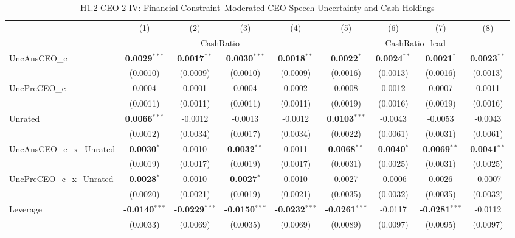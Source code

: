 \begin{landscape}
\begin{table}[H]
\setlength{\tabcolsep}{3pt}
\renewcommand{\arraystretch}{0.85}
\centering
\caption{H1.2 CEO 2-IV: Financial Constraint--Moderated CEO Speech Uncertainty and Cash Holdings}
\label{tab:h1_2_ceo2}
\scriptsize
\begin{tabular}{lcccccccc}
\toprule
 & (1) & (2) & (3) & (4) & (5) & (6) & (7) & (8) \\
 & \multicolumn{4}{c}{CashRatio} & \multicolumn{4}{c}{CashRatio\_lead} \\
\cmidrule(lr){2-5} \cmidrule(lr){6-9}
\midrule
UncAnsCEO\_c & \textbf{0.0029}$^{***}$ & \textbf{0.0017}$^{**}$ & \textbf{0.0030}$^{***}$ & \textbf{0.0018}$^{**}$ & \textbf{0.0022}$^{*}$ & \textbf{0.0024}$^{**}$ & \textbf{0.0021}$^{*}$ & \textbf{0.0023}$^{**}$ \\
 & (0.0010) & (0.0009) & (0.0010) & (0.0009) & (0.0016) & (0.0013) & (0.0016) & (0.0013) \\
UncPreCEO\_c & 0.0004 & 0.0001 & 0.0004 & 0.0002 & 0.0008 & 0.0012 & 0.0007 & 0.0011 \\
 & (0.0011) & (0.0011) & (0.0011) & (0.0011) & (0.0019) & (0.0016) & (0.0019) & (0.0016) \\
Unrated & \textbf{0.0066}$^{***}$ & -0.0012 & -0.0013 & -0.0012 & \textbf{0.0103}$^{***}$ & -0.0043 & -0.0053 & -0.0043 \\
 & (0.0012) & (0.0034) & (0.0017) & (0.0034) & (0.0022) & (0.0061) & (0.0031) & (0.0061) \\
UncAnsCEO\_c\_x\_Unrated & \textbf{0.0030}$^{*}$ & 0.0010 & \textbf{0.0032}$^{**}$ & 0.0011 & \textbf{0.0068}$^{**}$ & \textbf{0.0040}$^{*}$ & \textbf{0.0069}$^{**}$ & \textbf{0.0041}$^{**}$ \\
 & (0.0019) & (0.0017) & (0.0019) & (0.0017) & (0.0031) & (0.0025) & (0.0031) & (0.0025) \\
UncPreCEO\_c\_x\_Unrated & \textbf{0.0028}$^{*}$ & 0.0010 & \textbf{0.0027}$^{*}$ & 0.0010 & 0.0027 & -0.0006 & 0.0026 & -0.0007 \\
 & (0.0020) & (0.0021) & (0.0019) & (0.0021) & (0.0035) & (0.0032) & (0.0035) & (0.0032) \\
\midrule
Leverage & \textbf{-0.0140}$^{***}$ & \textbf{-0.0229}$^{***}$ & \textbf{-0.0150}$^{***}$ & \textbf{-0.0232}$^{***}$ & \textbf{-0.0261}$^{***}$ & -0.0117 & \textbf{-0.0281}$^{***}$ & -0.0112 \\
 & (0.0033) & (0.0069) & (0.0035) & (0.0069) & (0.0089) & (0.0097) & (0.0095) & (0.0097) \\

\end{tabular}
\end{table}
\end{landscape}
